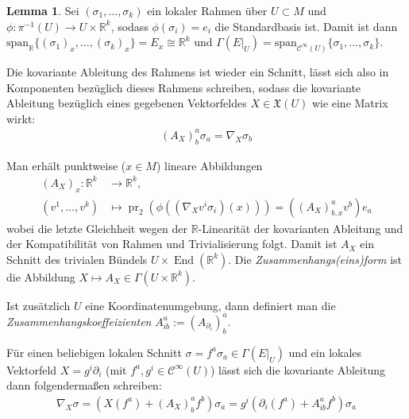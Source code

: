 \documentclass[a4paper]{scrreprt}
\numberwithin{equation}{chapter}
\DeclareMathOperator{\End}{End}
\DeclareMathOperator{\pr}{pr}
\newcommand{\R}{\mathbb{R}}
\newcommand{\sC}{\mathcal{C}^{\infty}}
\newcommand{\vf}{\mathfrak{X}}
\theoremstyle{definition}
\newtheorem{lemma}[defn]{Lemma}
\begin{document}
		\begin{lemma}
			Sei $(\sigma_1,\ldots,\sigma_k)$ ein lokaler Rahmen über $U\subset M$ und $\phi\colon\pi^{-1}(U)\rightarrow U\times \R^k$, sodass $\phi(\sigma_i)=e_i$ die Standardbasis ist. Damit ist dann $\mathrm{span}_{\R}\lbrace (\sigma_1)_x, \ldots,(\sigma_k)_x\rbrace=E_x\cong\R^k$ und $\Gamma(E\vert_U)=\mathrm{span}_{\sC(U)}\lbrace \sigma_1,\ldots,\sigma_k\rbrace$.
			
			Die kovariante Ableitung des Rahmens ist wieder ein Schnitt, lässt sich also in Komponenten bezüglich dieses Rahmens schreiben, sodass die kovariante Ableitung bezüglich eines gegebenen Vektorfeldes $X\in\vf(U)$ wie eine Matrix wirkt:
			\begin{align*}
				(A_X)^a_b\sigma_a=\nabla_X\sigma_b
			\end{align*}
			
			Man erhält punktweise ($x\in M$) lineare Abbildungen
			\begin{align*}
				(A_X)_x\colon\R^k&\rightarrow\R^k,\\
				(v^1,\ldots,v^k)&\mapsto \pr_2(\phi((\nabla_X v^i\sigma_i)(x)))=((A_X)_{b,x}^av^b)e_a
			\end{align*}
			wobei die letzte Gleichheit wegen der $\R$-Linearität der kovarianten Ableitung und der Kompatibilität von Rahmen und Trivialisierung folgt. Damit ist $A_X$ ein Schnitt des trivialen Bündels $U\times \End(\R^k)$. Die \emph{Zusammenhangs(eins)form} ist die Abbildung $X\mapsto A_X\in\Gamma(U\times \R^k)$.
			
			Ist zusätzlich $U$ eine Koordinatenumgebung, dann definiert man die \emph{Zusammenhangskoeffeizienten} $A_{ib}^a:=(A_{\partial_i})^a_b$.
			
			Für einen beliebigen lokalen Schnitt $\sigma=f^a\sigma_a\in\Gamma(E\vert_U)$ und ein lokales Vektorfeld $X=g^i\partial_i$ (mit $f^a,g^i\in\sC(U)$) lässt sich die kovariante Ableitung dann folgendermaßen schreiben:
			\begin{align*}
				\nabla_X\sigma=\left( X(f^a)+(A_X)^a_bf^b\right)\sigma_a=g^i\left( \partial_i(f^a)+A^a_{ib}f^b\right)\sigma_a
			\end{align*}
			

\end{lemma}
\end{document}
